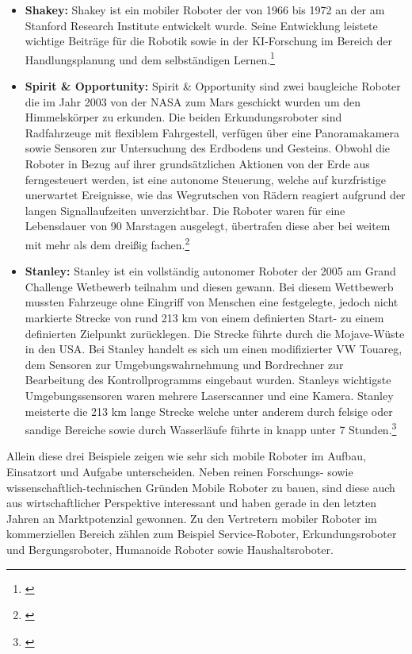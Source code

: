 \begin{itemize}
	\item{\textbf{Shakey:}} Shakey ist ein mobiler Roboter der von 1966 bis 1972 an der am Stanford Research Institute entwickelt wurde. Seine Entwicklung leistete wichtige Beiträge für die Robotik sowie in der KI-Forschung im Bereich der Handlungsplanung und dem selbständigen Lernen.\footnote{\citep[vgl.][Mobile Roboter, Seite 5 f.]{Hertzberg.MobileRoboter}\label{note4}}
	\item{\textbf{Spirit \& Opportunity:}} Spirit \& Opportunity sind zwei baugleiche Roboter die im Jahr 2003 von der NASA zum Mars geschickt wurden um den Himmelskörper zu erkunden. Die beiden Erkundungsroboter sind Radfahrzeuge mit flexiblem Fahrgestell, verfügen über eine Panoramakamera sowie Sensoren zur Untersuchung des Erdbodens und Gesteins. Obwohl die Roboter in Bezug auf ihrer grundsätzlichen Aktionen von der Erde aus ferngesteuert werden, ist eine autonome Steuerung, welche auf kurzfristige unerwartet Ereignisse, wie das Wegrutschen von Rädern reagiert aufgrund der langen Signallaufzeiten unverzichtbar. Die Roboter waren für eine
	Lebensdauer von 90 Marstagen ausgelegt, übertrafen diese aber bei weitem mit mehr als dem dreißig fachen.\footnote{\citep[vgl.][Mobile Roboter, Seite 8 f.]{Hertzberg.MobileRoboter}\label{note4}}
	\item{\textbf{Stanley:}} Stanley ist ein vollständig autonomer Roboter der 2005 am Grand Challenge Wetbewerb teilnahm und diesen gewann. Bei diesem Wettbewerb mussten Fahrzeuge ohne Eingriff von Menschen eine festgelegte, jedoch nicht markierte Strecke von rund 213 km von einem definierten Start- zu einem definierten Zielpunkt zurücklegen. Die Strecke führte durch die Mojave-Wüste in den USA. Bei Stanley handelt es sich um einen modifizierter VW Touareg, dem Sensoren zur Umgebungswahrnehmung und Bordrechner zur Bearbeitung des Kontrollprogramms eingebaut wurden. Stanleys wichtigste Umgebungssensoren waren mehrere Laserscanner und eine Kamera. Stanley meisterte die 213 km lange Strecke welche unter anderem durch felsige oder sandige Bereiche sowie durch Wasserläufe führte in knapp unter 7 Stunden.\footnote{\citep[vgl.][Mobile Roboter, Seite 9 f.]{Hertzberg.MobileRoboter}\label{note5}}
\end{itemize}
Allein diese drei Beispiele zeigen wie sehr sich mobile Roboter im Aufbau, Einsatzort und Aufgabe unterscheiden. Neben reinen Forschungs- sowie wissenschaftlich-technischen Gründen Mobile Roboter zu bauen, sind diese auch aus wirtschaftlicher Perspektive interessant und haben gerade in den letzten Jahren an Marktpotenzial gewonnen.
\newline
Zu den Vertretern mobiler Roboter im kommerziellen Bereich zählen zum Beispiel Service-Roboter, Erkundungsroboter und Bergungsroboter, Humanoide Roboter sowie Haushaltsroboter.
